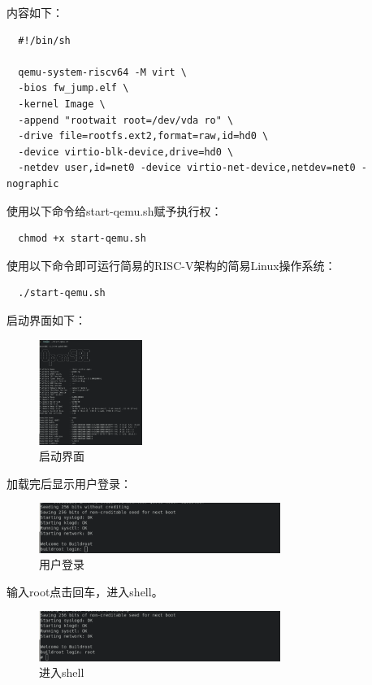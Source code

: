 \documentclass[lang=cn,10pt]{elegantbook}
\begin{document}
内容如下：


\begin{lstlisting}
  #!/bin/sh

  qemu-system-riscv64 -M virt \
  -bios fw_jump.elf \
  -kernel Image \
  -append "rootwait root=/dev/vda ro" \
  -drive file=rootfs.ext2,format=raw,id=hd0 \
  -device virtio-blk-device,drive=hd0 \
  -netdev user,id=net0 -device virtio-net-device,netdev=net0 -nographic
\end{lstlisting}

使用以下命令给start-qemu.sh赋予执行权：

\begin{lstlisting}
  chmod +x start-qemu.sh
\end{lstlisting}

使用以下命令即可运行简易的RISC-V架构的简易Linux操作系统：

\begin{lstlisting}
  ./start-qemu.sh
\end{lstlisting}

\newpage
启动界面如下：
\begin{figure}[htbp]
  \centering
  \includegraphics[width=0.3\textwidth]{image/image-20231105103328525.png}
  \caption{启动界面}
\end{figure}

加载完后显示用户登录：
\begin{figure}[htbp]
  \centering
  \includegraphics[width=0.7\textwidth]{image/image-20231105103401143.png}
  \caption{用户登录}
\end{figure}

输入root点击回车，进入shell。
\begin{figure}[htbp]
  \centering
  \includegraphics[width=0.7\textwidth]{image/image-20231105103508731.png}
  \caption{进入shell}
\end{figure}
\end{document}
